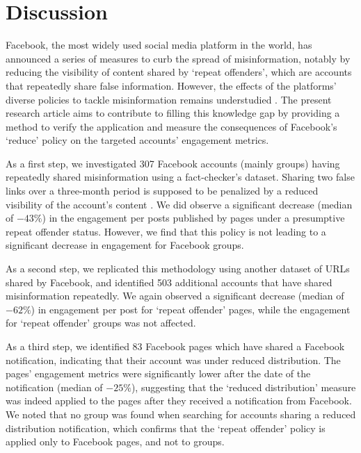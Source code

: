\documentclass[review]{elsarticle}
\begin{document}
{{\section{Discussion}

Facebook, the most widely used social media platform in the world, has announced a series of measures to curb the spread of misinformation, notably by reducing the visibility of content shared by `repeat offenders', which are accounts that repeatedly share false information. 
However, the effects of the platforms' diverse policies to tackle misinformation remains understudied \citep{pasquetto2020tackling}. 
The present research article aims to contribute to filling this knowledge gap by providing a method to verify the application and measure the consequences of Facebook's `reduce' policy on the targeted accounts' engagement metrics.

As a first step, we investigated 307 Facebook accounts (mainly groups) having repeatedly shared misinformation using a fact-checker's dataset. 
Sharing two false links over a three-month period is supposed to be penalized by a reduced visibility of the account's content \cite{2strikes90daysRule}. 
We did observe a significant decrease (median of $-43\%$) in the engagement per posts published by pages under a presumptive repeat offender status.
However, we find that this policy is not leading to a significant decrease in engagement for Facebook groups.

As a second step, we replicated this methodology using another dataset of URLs shared by Facebook, and identified 503 additional accounts that have shared misinformation repeatedly. 
We again observed a significant decrease (median of $-62\%$) in engagement per post for `repeat offender' pages, while the engagement for `repeat offender' groups was not affected.
 
As a third step, we identified 83 Facebook pages which have shared a Facebook notification, indicating that their account was under reduced distribution.
The pages' engagement metrics were significantly lower after the date of the notification (median of $-25\%$), suggesting that the `reduced distribution' measure was indeed applied to the pages after they received a notification from Facebook.
We noted that no group was found when searching for accounts sharing a reduced distribution notification, which confirms that the `repeat offender' policy is applied only to Facebook pages, and not to groups.

}}
\end{document}
